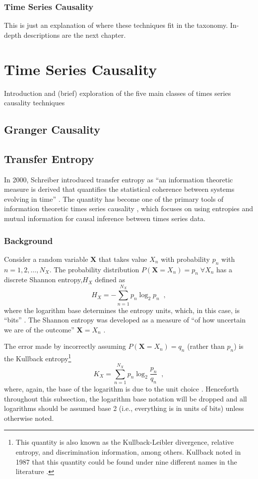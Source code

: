 \documentclass{article}[10pt]
\begin{document}
\subsubsection{Time Series Causality} 
This is just an explanation of where these techniques fit in the taxonomy.  In-depth descriptions are the next chapter.

\section{Time Series Causality} 
Introduction and (brief) exploration of the five main classes of times series causality techniques
\subsection{Granger Causality}
\subsection{Transfer Entropy}
In 2000, Schreiber introduced transfer entropy as ``an information theoretic measure is derived that quantifies the statistical coherence between systems evolving in time'' \cite{Schreiber2000}.  The quantity has become one of the primary tools of information theoretic times series causality \cite{Hlav2007,Kaiser2002}, which focuses on using entropies and mutual information for causal inference between times series data.  

\subsubsection{Background}
Consider a random variable $\mathbf{X}$ that takes value $X_n$ with probability $p_n$ with $n = 1,2,\ldots,N_X$.  The probability distribution $P(\mathbf{X}=X_n) = p_n\;\forall X_n$ has a discrete Shannon entropy,$H_X$ defined as
\begin{equation}
H_X = -\sum_{n=1}^{N_X} p_n \log_2 p_n\;\;,
\end{equation}
where the logarithm base determines the entropy units, which, in this case, is ``bits'' \cite{Shannon1948,Schreiber2000,Hlav2007,Kaiser2002}.  The Shannon entropy was developed as a measure of ``of how uncertain we are of the outcome'' $\mathbf{X}=X_n$ \cite{Shannon1948}.

The error made by incorrectly assuming $P(\mathbf{X}=X_n) = q_n$ (rather than $p_n$) is the Kullback entropy\footnote{This quantity is also known as the Kullback-Leibler divergence, relative entropy, and discrimination information, among others.  Kullback noted in 1987 that this quantity could be found under nine different names in the literature \cite{Kullback1987}.}
\begin{equation}
K_X =  \sum_{n=1}^{N_X} p_n \log_2 \frac{p_n}{q_n}\;\;,
\end{equation}
where, again, the base of the logarithm is due to the unit choice \cite{Kullback1951,Schreiber2000,Hlav2007,Kaiser2002}.  Henceforth throughout this subsection, the logarithm base notation will be dropped and all logarithms should be assumed base 2 (i.e., everything is in units of bits) unless otherwise noted.
\end{document}
